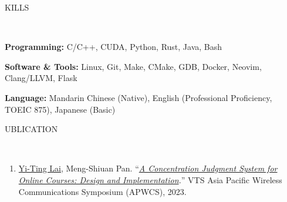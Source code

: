 \documentclass[11pt]{article}
\begin{document}


\newpage

\begin{center}
    \scalebox{1.3}{S}KILLS\raggedright \,\hrulefill
\end{center}
\textbf{Programming:} C/C++, CUDA, Python, Rust, Java, Bash

\textbf{Software \& Tools:}  Linux, Git, Make, CMake, GDB, Docker, Neovim, Clang/LLVM, Flask

\textbf{Language:} Mandarin Chinese (Native), English (Professional Proficiency, TOEIC 875), Japanese (Basic)

\begin{center}
    \scalebox{1.3}{P}UBLICATION\raggedright \,\hrulefill
\end{center}

\begin{enumerate}[noitemsep, topsep=0pt, partopsep=0pt, parsep=0pt, leftmargin=*]
    \item \underline{Yi-Ting Lai}, Meng-Shiuan Pan. ``\textit{\href{https://ieeexplore.ieee.org/document/10234058}{A Concentration Judgment System for Online Courses: Design and Implementation}.}'' VTS Asia Pacific Wireless Communications Symposium (APWCS), 2023.
\end{enumerate}
\end{document}
